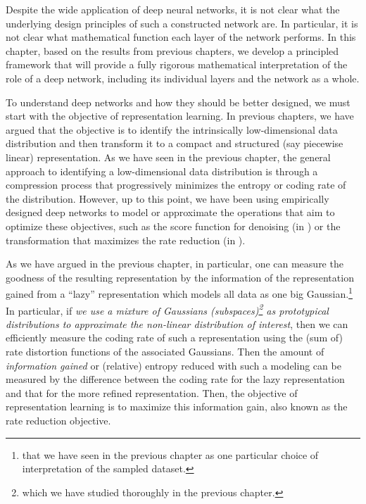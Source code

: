 \documentclass[../../book-main.tex]{subfiles}
\begin{document}
Despite the wide application of deep neural networks, it is not clear what the underlying design principles of such a constructed network are. In particular, it is not clear what mathematical function each layer of the network performs. In this chapter, based on the results from previous chapters, we develop a principled framework that will provide a fully rigorous mathematical interpretation of the role of a deep network, including its individual layers and the network as a whole. 

To understand deep networks and how they should be better designed, we must start with the objective of representation learning. In previous chapters, we have argued that the objective is to identify the intrinsically low-dimensional data distribution and then transform it to a compact and structured (say piecewise linear) representation. As we have seen in the previous chapter, the general approach to identifying a low-dimensional data distribution is through a compression process that progressively minimizes the entropy or coding rate of the distribution. However, up to this point, we have been using empirically designed deep networks to model or approximate the operations that aim to optimize these objectives, such as the score function for denoising (in ) or the transformation that maximizes the rate reduction (in ). 

As we have argued in the previous chapter,  in particular, one can measure the goodness of the resulting representation by the information of the representation gained from a ``lazy'' representation which models all data as one big Gaussian.\footnote{that we have seen in the previous chapter as one particular choice of interpretation of the sampled dataset.} In particular, if \textit{we use a mixture of Gaussians (subspaces)\footnote{which we have studied thoroughly in the previous chapter.} as prototypical distributions to approximate the non-linear distribution of interest}, then we can efficiently measure the coding rate of such a representation using the (sum of) rate distortion functions of the associated Gaussians. Then the amount of {\em information gained} or (relative) entropy reduced with such a modeling can be measured by the difference between the coding rate for the lazy representation and that for the more refined representation. Then,  the objective of representation learning is to maximize this information gain, also known as the rate reduction objective. 
\end{document}
